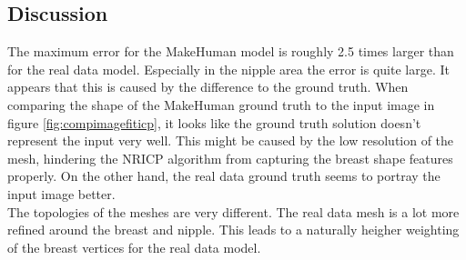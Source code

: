 \subsection{Discussion}
The maximum error for the MakeHuman model is roughly 2.5 times larger than for the real data model. Especially in the nipple area the error is quite large. It appears that this is caused by the difference to the ground truth. When comparing the shape of the MakeHuman ground truth to the input image in figure \ref{fig:compimagefiticp}, it looks like the ground truth solution doesn't represent the input very well. This might be caused by the low resolution of the mesh, hindering the NRICP algorithm from capturing the breast shape features properly. On the other hand, the real data ground truth seems to portray the input image better.\\ The topologies of the meshes are very different. The real data mesh is a lot more refined around the breast and nipple. This leads to a naturally heigher weighting of the breast vertices for the real data model. %

